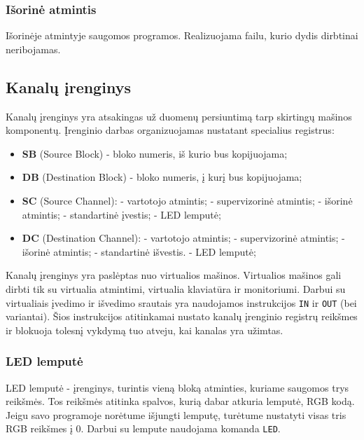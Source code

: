 \documentclass{scrartcl}
\begin{document}
            \subsubsection{Išorinė atmintis}
                Išorinėje atmintyje saugomos programos. Realizuojama failu, kurio dydis dirbtinai neribojamas.
        \subsection{Kanalų įrenginys}
            Kanalų įrenginys yra atsakingas už duomenų persiuntimą tarp skirtingų mašinos komponentų. Įrenginio darbas organizuojamas nustatant specialius registrus:
            \begin{itemize}
                \item \textbf{SB} (Source Block) - bloko numeris, iš kurio bus kopijuojama;
                \item \textbf{DB} (Destination Block) - bloko numeris, į kurį bus kopijuojama;
                \item \textbf{SC} (Source Channel):
                     - vartotojo atmintis;
                     - supervizorinė atmintis;
                     - išorinė atmintis;
                     - standartinė įvestis;
                     - LED lemputė;
                \item \textbf{DC} (Destination Channel):
                     - vartotojo atmintis;
                     - supervizorinė atmintis;
                     - išorinė atmintis;
                     - standartinė išvestis.
                     - LED lemputė;                    
            \end{itemize}
            Kanalų įrenginys yra paslėptas nuo virtualios mašinos. Virtualios mašinos gali dirbti tik su virtualia atmintimi, virtualia klaviatūra ir monitoriumi. Darbui su virtualiais įvedimo ir išvedimo srautais yra naudojamos instrukcijos \texttt{IN} ir \texttt{OUT} (bei variantai). Šios instrukcijos atitinkamai nustato kanalų įrenginio registrų reikšmes ir blokuoja tolesnį vykdymą tuo atveju, kai kanalas yra užimtas.
            \subsubsection{LED lemputė}
            	LED lemputė - įrenginys, turintis vieną bloką atminties, kuriame saugomos trys reikšmės. Tos reikšmės atitinka spalvos, kurią dabar atkuria lemputė, RGB kodą. Jeigu savo programoje norėtume išjungti lemputę, turėtume nustatyti visas tris RGB reikšmes į 0. Darbui su lempute naudojama komanda
            	\texttt{LED}.
    \pagebreak
\end{document}
